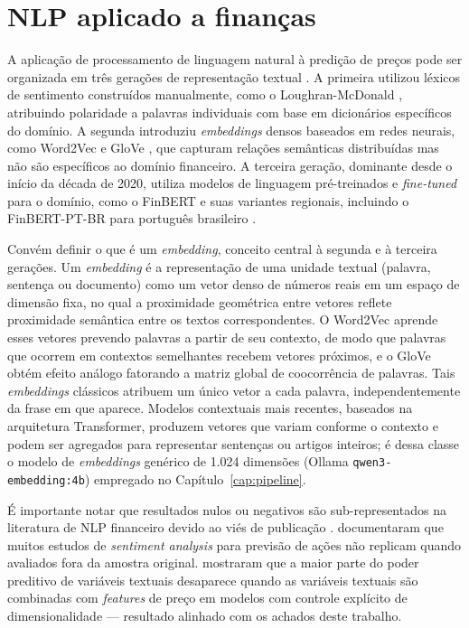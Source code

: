 \section{NLP aplicado a finanças}

A aplicação de processamento de linguagem natural à predição de preços pode ser organizada em três gerações de representação textual \cite{kellyxiu2023}. A primeira utilizou léxicos de sentimento construídos manualmente, como o Loughran-McDonald \cite{loughran2011}, atribuindo polaridade a palavras individuais com base em dicionários específicos do domínio. A segunda introduziu \textit{embeddings} densos baseados em redes neurais, como Word2Vec \cite{mikolov2013} e GloVe \cite{pennington2014}, que capturam relações semânticas distribuídas mas não são específicos ao domínio financeiro. A terceira geração, dominante desde o início da década de 2020, utiliza modelos de linguagem pré-treinados e \textit{fine-tuned} para o domínio, como o FinBERT \cite{araci2019} e suas variantes regionais, incluindo o FinBERT-PT-BR para português brasileiro \cite{souza2023}.

Convém definir o que é um \textit{embedding}, conceito central à segunda e à terceira gerações. Um \textit{embedding} é a representação de uma unidade textual (palavra, sentença ou documento) como um vetor denso de números reais em um espaço de dimensão fixa, no qual a proximidade geométrica entre vetores reflete proximidade semântica entre os textos correspondentes. O Word2Vec aprende esses vetores prevendo palavras a partir de seu contexto, de modo que palavras que ocorrem em contextos semelhantes recebem vetores próximos, e o GloVe obtém efeito análogo fatorando a matriz global de coocorrência de palavras. Tais \textit{embeddings} clássicos atribuem um único vetor a cada palavra, independentemente da frase em que aparece. Modelos contextuais mais recentes, baseados na arquitetura Transformer, produzem vetores que variam conforme o contexto e podem ser agregados para representar sentenças ou artigos inteiros; é dessa classe o modelo de \textit{embeddings} genérico de 1.024 dimensões (Ollama \texttt{qwen3-embedding:4b}) empregado no Capítulo~\ref{cap:pipeline}.

É importante notar que resultados nulos ou negativos são sub-representados na literatura de NLP financeiro devido ao viés de publicação \cite{shah2019}.  documentaram que muitos estudos de \textit{sentiment analysis} para previsão de ações não replicam quando avaliados fora da amostra original.  mostraram que a maior parte do poder preditivo de variáveis textuais desaparece quando as variáveis textuais são combinadas com \textit{features} de preço em modelos com controle explícito de dimensionalidade --- resultado alinhado com os achados deste trabalho.

